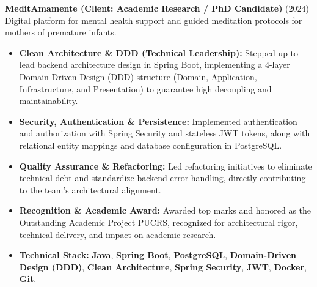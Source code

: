 \documentclass[10pt, letterpaper]{article}
\begin{document}
\textbf{MeditAmamente (Client: Academic Research / PhD Candidate)} \hfill (2024) \\
Digital platform for mental health support and guided meditation protocols for mothers of premature infants.
\begin{itemize}
    \item \textbf{Clean Architecture \& DDD (Technical Leadership):} Stepped up to lead backend architecture design in Spring Boot, implementing a 4-layer Domain-Driven Design (DDD) structure (Domain, Application, Infrastructure, and Presentation) to guarantee high decoupling and maintainability.

    \item \textbf{Security, Authentication \& Persistence:} Implemented authentication and authorization with Spring Security and stateless JWT tokens, along with relational entity mappings and database configuration in PostgreSQL.

    \item \textbf{Quality Assurance \& Refactoring:} Led refactoring initiatives to eliminate technical debt and standardize backend error handling, directly contributing to the team's architectural alignment.

    \item \textbf{Recognition \& Academic Award:} Awarded top marks and honored as the Outstanding Academic Project PUCRS, recognized for architectural rigor, technical delivery, and impact on academic research.

    \item \textbf{Technical Stack:} \textbf{Java}, \textbf{Spring Boot}, \textbf{PostgreSQL}, \textbf{Domain-Driven Design (DDD)}, \textbf{Clean Architecture}, \textbf{Spring Security}, \textbf{JWT}, \textbf{Docker}, \textbf{Git}.
\end{itemize}
\end{document}

